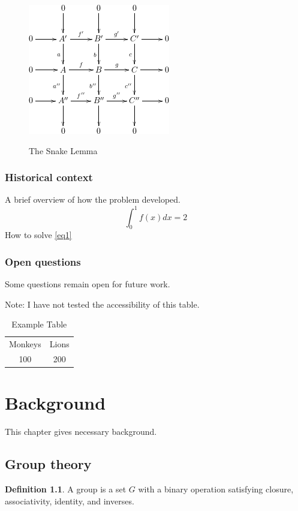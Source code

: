 \documentclass[12pt,reqno,oneside]{amsbook}
\theoremstyle{definition}
\newtheorem{definition}[theorem]{Definition}
\begin{document}
\begin{figure}\label{fig2}
\includegraphics[alt="Description of Image that serves the same purpose",scale=0.8]{figure.png}
\caption{The Snake Lemma}
\end{figure}


\subsection{Historical context}
A brief overview of how the problem developed.
\begin{equation}\label{eq1}\int_0^1 f(x) dx = 2\end{equation}
How to solve \eqref{eq1}
\subsection{Open questions}
Some questions remain open for future work.

Note: I have not tested the accessibility of this table.
\begin{table}[h]
\centering
\begin{tabular}{cc}
Monkeys & Lions \\
100 & 200
\end{tabular}
\caption{Example Table}
\end{table}


\chapter{Background}
This chapter gives necessary background.

\section{Group theory}
\begin{definition}
A group is a set $G$ with a binary operation satisfying closure, associativity, identity, and inverses.
\end{definition}
\end{document}
